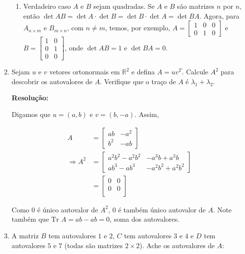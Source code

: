 \documentclass[leqno]{article}
\begin{document}
\begin{enumerate}
\begin{enumerate}
        \item Verdadeiro caso $A$ e $B$ sejam quadradas. Se $A$ e $B$ são matrizes $n$ por $n$, então $\det AB=\det A\cdot\det B=\det B\cdot\det A=\det BA$. Agora, para $A_{n\times m}$ e $B_{m\times n}$, com $n\neq m$, temos, por exemplo, $A=\begin{bmatrix}1 & 0 & 0\\
        0 & 1 & 0\end{bmatrix}$ e $B=\begin{bmatrix}1 & 0\\
        0 & 1\\
        0 & 0\end{bmatrix}$, onde $\det AB = 1$ e $\det BA = 0$.
    \end{enumerate}
    
    \item Sejam $u$ e $v$ vetores ortonormais em $\mathbb{R}^2$ e defina $A=uv^T$. Calcule $A^2$ para descobrir os autovalores de $A$. Verifique que o traço de $A$ é $\lambda_1+\lambda_2$.
    
    \textbf{Resolução:}

    Digamos que $u=(a,b)$ e $v=(b,-a)$. Assim,

    \begin{align*}
        A&=\begin{bmatrix}
        ab & -a^2\\
        b^2 & -ab
        \end{bmatrix}\\
        \Rightarrow A^2&=\begin{bmatrix}
        a^2b^2-a^2b^2 & -a^3b+a^3b\\
        ab^3-ab^3 & -a^2b^2+a^2b^2
        \end{bmatrix}\\
        &=\begin{bmatrix}
        0 & 0\\
        0 & 0\\
        \end{bmatrix}
    \end{align*}
    
    Como $0$ é único autovalor de $A^2$, $0$ é também único autovalor de $A$. Note também que $\text{Tr }A=ab-ab=0$, soma dos autovalores.
    
    \item A matriz $B$ tem autovalores $1$ e $2$, $C$ tem autovalores $3$ e $4$ e $D$ tem autovalores $5$ e $7$ (todas são matrizes $2\times2$). Ache os autovalores de $A$:
    

\end{enumerate}
\end{document}
